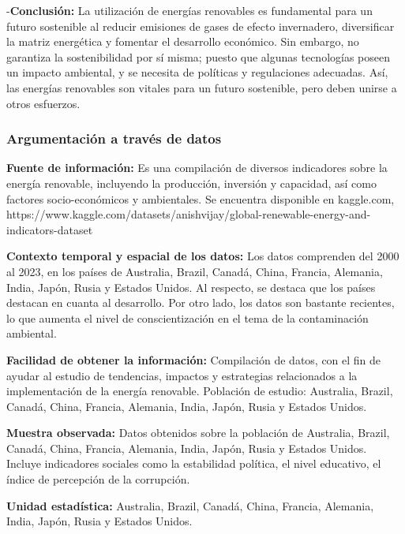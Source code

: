 \documentclass[
  letterpaper,
  DIV=11,
  numbers=noendperiod]{scrreprt}
\begin{document}
-\textbf{Conclusión:} La utilización de energías renovables es
fundamental para un futuro sostenible al reducir emisiones de gases de
efecto invernadero, diversificar la matriz energética y fomentar el
desarrollo económico. Sin embargo, no garantiza la sostenibilidad por sí
misma; puesto que algunas tecnologías poseen un impacto ambiental, y se
necesita de políticas y regulaciones adecuadas. Así, las energías
renovables son vitales para un futuro sostenible, pero deben unirse a
otros esfuerzos.

\subsubsection{Argumentación a través de
datos}\label{argumentaciuxf3n-a-travuxe9s-de-datos}

\textbf{Fuente de información:} Es una compilación de diversos
indicadores sobre la energía renovable, incluyendo la producción,
inversión y capacidad, así como factores socio-económicos y ambientales.
Se encuentra disponible en kaggle.com,
https://www.kaggle.com/datasets/anishvijay/global-renewable-energy-and-indicators-dataset

\textbf{Contexto temporal y espacial de los datos:} Los datos comprenden
del 2000 al 2023, en los países de Australia, Brazil, Canadá, China,
Francia, Alemania, India, Japón, Rusia y Estados Unidos. Al respecto, se
destaca que los países destacan en cuanta al desarrollo. Por otro lado,
los datos son bastante recientes, lo que aumenta el nivel de
conscientización en el tema de la contaminación ambiental.

\textbf{Facilidad de obtener la información:} Compilación de datos, con
el fin de ayudar al estudio de tendencias, impactos y estrategias
relacionados a la implementación de la energía renovable. Población de
estudio: Australia, Brazil, Canadá, China, Francia, Alemania, India,
Japón, Rusia y Estados Unidos.

\textbf{Muestra observada:} Datos obtenidos sobre la población de
Australia, Brazil, Canadá, China, Francia, Alemania, India, Japón, Rusia
y Estados Unidos. Incluye indicadores sociales como la estabilidad
política, el nivel educativo, el índice de percepción de la corrupción.

\textbf{Unidad estadística:} Australia, Brazil, Canadá, China, Francia,
Alemania, India, Japón, Rusia y Estados Unidos.
\end{document}
